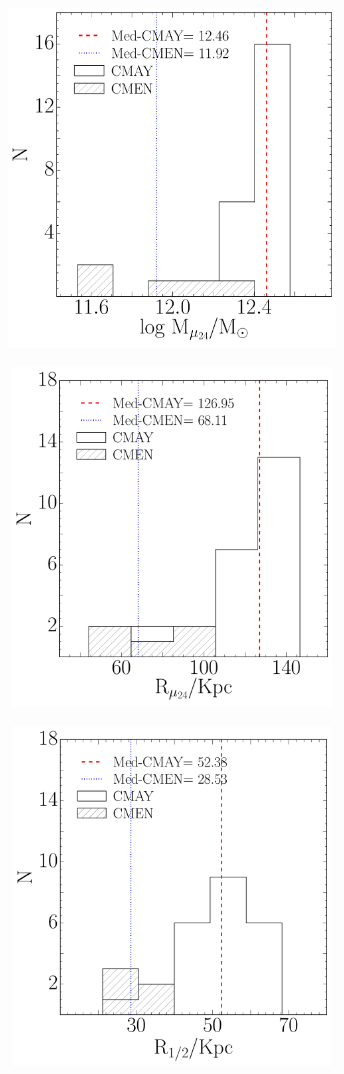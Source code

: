 \begin{figure}[H]
 \centering
 \includegraphics[height=9cm, width=9cm]{../al_final/LR/evolucion/histogramas/Mmu_grandes_chicasz0.pdf}
\end{figure}
\begin{figure}[H]
 \centering
 \includegraphics[height=9cm, width=9cm]{../al_final/LR/evolucion/histogramas/R24_grandes_chicasz0.pdf}
\end{figure}
\begin{figure}[H]
 \centering
 \includegraphics[height=9cm, width=9cm]{../al_final/LR/evolucion/histogramas/R50_grandes_chicasz0.pdf}
\end{figure}



